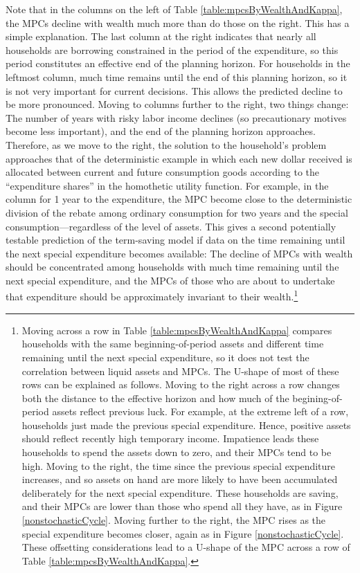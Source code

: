 \documentclass[fleqccn,12pt]{article}
\begin{document}
Note that in the columns on the left of Table \ref{table:mpcsByWealthAndKappa}, the MPCs decline with wealth much more than do those on the right. This has a simple explanation. The last column at the right indicates that nearly all households are borrowing constrained in the period of the expenditure, so this period constitutes an effective end of the planning horizon. For households in the leftmost column, much time remains until the end of this planning horizon, so it is not very important for current decisions. This allows the \citeauthor{ecta1996CarrollKimball} predicted decline to be more pronounced. Moving to columns further to the right, two things change: The number of years with risky labor income declines (so precautionary motives become less important), and the end of the planning horizon approaches. Therefore, as we move to the right, the solution to the household's problem approaches that of the deterministic example in which each new dollar received is allocated between current and future consumption goods according to the ``expenditure shares'' in the homothetic utility function. For example, in the column for 1 year to the expenditure, the MPC become close to the deterministic division of the rebate among ordinary consumption for two years and the special consumption---regardless of the level of assets. This gives a second potentially testable prediction of the term-saving model if data on the time remaining until the next special expenditure becomes available: The decline of MPCs with wealth should be concentrated among households with much time remaining until the next special expenditure, and the MPCs of those who are about to undertake that expenditure should be approximately invariant to their wealth.\footnote{Moving across a row in Table \ref{table:mpcsByWealthAndKappa} compares households with the same beginning-of-period assets and different time remaining until the next special expenditure, so it does not test the correlation between liquid assets and MPCs. The U-shape of most of these rows can be explained as follows. Moving to the right across a row changes both the distance to the effective horizon and how much of the begining-of-period assets reflect previous luck. For example, at the extreme left of a row, households just made the previous special expenditure. Hence, positive assets should reflect recently high temporary income. Impatience leads these households to spend the assets down to zero, and their MPCs tend to be high. Moving to the right, the time since the previous special expenditure increases, and so assets on hand are more likely to have been accumulated deliberately for the next special expenditure. These households are saving, and their MPCs are lower than those who spend all they have, as in Figure \ref{nonstochasticCycle}. Moving further to the right, the MPC rises as the special expenditure becomes closer, again as in Figure \ref{nonstochasticCycle}.  These offsetting considerations lead to a U-shape of the MPC across a row of Table \ref{table:mpcsByWealthAndKappa}.}
\end{document}
